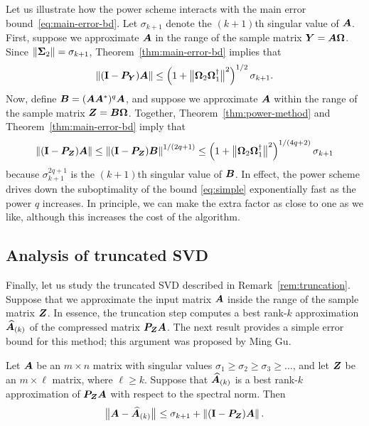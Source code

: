\documentclass[final]{siamltex}
\newcounter{algorithm}[section]
\newcommand{\notate}[1]{\textcolor{red}{\textbf{[#1]}}}
\begin{document}
Let us illustrate how the power scheme interacts with the main
error bound~\eqref{eq:main-error-bd}.
Let $\sigma_{k+1}$ denote the $(k+1)$th singular value of $\bm{A}$.
First, suppose we approximate $\bm{A}$ in the range of the sample matrix $\bm{Y} = \bm{A\Omega}$.
Since $\left\Vert {\bm{\Sigma}_2} \right\Vert = \sigma_{k+1}$, Theorem~\ref{thm:main-error-bd} implies that
\begin{equation} \label{eq:simple}
\norm{ (\Id - \mtx{P}_{\mtx{Y}}) \mtx{A} }
    \leq \left( 1 + \smnorm{}{\mtx{\Omega}_2 \mtx{\Omega}_1^\psinv}^2 \right)^{1/2}
    \sigma_{k+1}.
\end{equation}
Now, define $\bm{B} = (\bm{AA}^*)^q \bm{A}$, and suppose
we approximate $\bm{A}$ within the range of the sample matrix
$\bm{Z} = \bm{B\Omega}$.  Together, Theorem~\ref{thm:power-method}
and Theorem~\ref{thm:main-error-bd} imply that
$$
\left\Vert { (\mathbf{I}- \bm{P}_{\bm{Z}}) \bm{A} } \right\Vert
    \leq \left\Vert { (\mathbf{I}- \bm{P}_{\bm{Z}}) \bm{B} } \right\Vert^{1/(2q+1)}
    \leq \left( 1 + {\bigl\Vert {\bm{\Omega}_2 \bm{\Omega}_1^\dagger} \bigr\Vert}_{}^2 \right)^{1/(4q+2)}
        \sigma_{k+1}
$$
because $\sigma_{k+1}^{2q+1}$ is the $(k+1)$th singular value of $\bm{B}$.
In effect, the power scheme drives down the suboptimality of the bound \eqref{eq:simple}
exponentially fast as the power $q$ increases.  In principle, we can make the extra
factor as close to one as we like, although this increases the cost of the algorithm.


\subsection{Analysis of truncated SVD} \label{sec:truncation-analysis}


Finally, let us study the truncated SVD described in Remark~\ref{rem:truncation}.
Suppose that we approximate the input matrix $\bm{A}$ inside the range of the sample matrix $\bm{Z}$.
In essence, the truncation step computes a best rank-$k$ approximation $\widehat{\bm{A}}_{(k)}$ of the
compressed matrix $\bm{P}_{\bm{Z}} \bm{A}$.  The next result provides a simple error bound for this method; this argument was proposed by Ming Gu.

\lsp

\begin{theorem} \label{thm:truncation}
Let $\bm{A}$ be an $m \times n$ matrix with singular values $\sigma_1 \geq \sigma_2 \geq \sigma_3 \geq \dots$,
and let $\bm{Z}$ be an $m \times \ell$ matrix, where $\ell \geq k$.
Suppose that $\widehat{\bm{A}}_{(k)}$ is a best rank-$k$ approximation of $\bm{P}_{\bm{Z}} \bm{A}$ with respect to the spectral norm.  Then
$$
{\bigl\Vert { \bm{A} - \widehat{\bm{A}}_{(k)} } \bigr\Vert}_{}
	\leq \sigma_{k+1} + \left\Vert {(\mathbf{I}- \bm{P}_{\bm{Z}}) \bm{A}} \right\Vert.
$$
\end{theorem}
\end{document}
